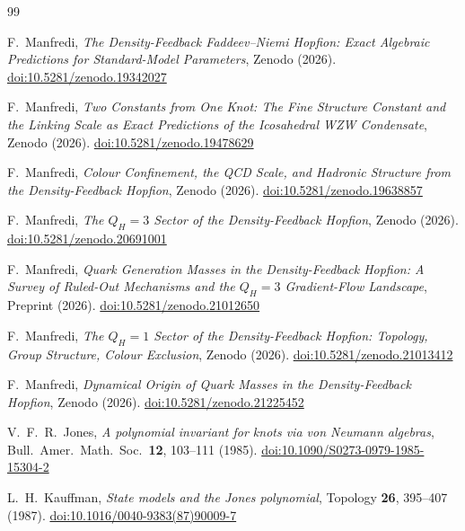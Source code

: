 \documentclass[11pt,a4paper]{article}
\theoremstyle{definition}\newtheorem{definition}[theorem]{Definition}
\theoremstyle{remark}
\begin{document}
\begin{thebibliography}{99}

F.~Manfredi,
\textit{The Density-Feedback Faddeev--Niemi Hopfion:
  Exact Algebraic Predictions for Standard-Model Parameters},
Zenodo (2026).
\href{https://doi.org/10.5281/zenodo.19342027}{doi:10.5281/zenodo.19342027}

F.~Manfredi,
\textit{Two Constants from One Knot: The Fine Structure Constant and
  the Linking Scale as Exact Predictions of the Icosahedral WZW Condensate},
Zenodo (2026).
\href{https://doi.org/10.5281/zenodo.19478629}{doi:10.5281/zenodo.19478629}

F.~Manfredi,
\textit{Colour Confinement, the QCD Scale, and Hadronic Structure
  from the Density-Feedback Hopfion},
Zenodo (2026).
\href{https://doi.org/10.5281/zenodo.19638857}{doi:10.5281/zenodo.19638857}

F.~Manfredi,
\textit{The $Q_H=3$ Sector of the Density-Feedback Hopfion},
Zenodo (2026).
\href{https://doi.org/10.5281/zenodo.20691001}{doi:10.5281/zenodo.20691001}

F.~Manfredi,
\textit{Quark Generation Masses in the Density-Feedback Hopfion:
A Survey of Ruled-Out Mechanisms and the $Q_H=3$ Gradient-Flow Landscape},
Preprint (2026).
\href{https://doi.org/10.5281/zenodo.21012650}{doi:10.5281/zenodo.21012650}

 F.~Manfredi,
\textit{The $Q_H=1$ Sector of the
Density-Feedback Hopfion: Topology, Group Structure, Colour Exclusion},
Zenodo (2026).
\href{https://doi.org/10.5281/zenodo.21013412}{doi:10.5281/zenodo.21013412}

F.~Manfredi,
\textit{Dynamical Origin of Quark Masses in the Density-Feedback Hopfion},
Zenodo (2026).
\href{https://doi.org/10.5281/zenodo.21225452}{doi:10.5281/zenodo.21225452}

V.~F.~R.~Jones,
\textit{A polynomial invariant for knots via von Neumann algebras},
Bull.\ Amer.\ Math.\ Soc.\ \textbf{12}, 103--111 (1985).
\href{https://doi.org/10.1090/S0273-0979-1985-15304-2}{doi:10.1090/S0273-0979-1985-15304-2}

L.~H.~Kauffman,
\textit{State models and the Jones polynomial},
Topology \textbf{26}, 395--407 (1987).
\href{https://doi.org/10.1016/0040-9383(87)90009-7}{doi:10.1016/0040-9383(87)90009-7}


\end{thebibliography}
\end{document}
